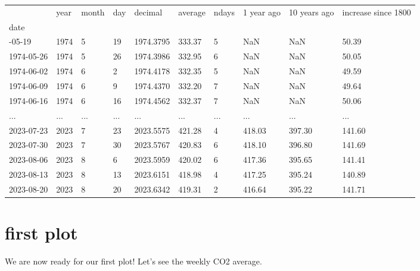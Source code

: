 \documentclass[
  letterpaper,
  DIV=11,
  numbers=noendperiod,
  oneside]{scrreprt}
\begin{document}
\begin{longtable}[]{@{}llllllllll@{}}
\toprule\noalign{}
& year & month & day & decimal & average & ndays & 1 year ago & 10 years
ago & increase since 1800 \\
date & & & & & & & & & \\
\midrule\noalign{}
\endhead
\bottomrule\noalign{}
\endlastfoot
1974-05-19 & 1974 & 5 & 19 & 1974.3795 & 333.37 & 5 & NaN & NaN &
50.39 \\
1974-05-26 & 1974 & 5 & 26 & 1974.3986 & 332.95 & 6 & NaN & NaN &
50.05 \\
1974-06-02 & 1974 & 6 & 2 & 1974.4178 & 332.35 & 5 & NaN & NaN &
49.59 \\
1974-06-09 & 1974 & 6 & 9 & 1974.4370 & 332.20 & 7 & NaN & NaN &
49.64 \\
1974-06-16 & 1974 & 6 & 16 & 1974.4562 & 332.37 & 7 & NaN & NaN &
50.06 \\
... & ... & ... & ... & ... & ... & ... & ... & ... & ... \\
2023-07-23 & 2023 & 7 & 23 & 2023.5575 & 421.28 & 4 & 418.03 & 397.30 &
141.60 \\
2023-07-30 & 2023 & 7 & 30 & 2023.5767 & 420.83 & 6 & 418.10 & 396.80 &
141.69 \\
2023-08-06 & 2023 & 8 & 6 & 2023.5959 & 420.02 & 6 & 417.36 & 395.65 &
141.41 \\
2023-08-13 & 2023 & 8 & 13 & 2023.6151 & 418.98 & 4 & 417.25 & 395.24 &
140.89 \\
2023-08-20 & 2023 & 8 & 20 & 2023.6342 & 419.31 & 2 & 416.64 & 395.22 &
141.71 \\
\end{longtable}

\hypertarget{first-plot}{%
\section{first plot}\label{first-plot}}

We are now ready for our first plot! Let's see the weekly CO2 average.
\end{document}

